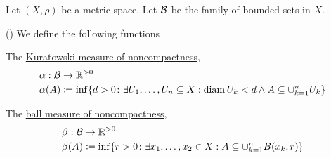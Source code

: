 Let $(X, \rho)$ be a metric space. Let $\mathcal{B}$ be the family of bounded sets in $X$.

\begin{definition}\label{def:noncompactness_measures}(\cite[definition 7.1]{Deimling1985})
  We define the following functions
  \begin{defenum}
    \item\label{def:noncompactness_measures/sets} The \uline{Kuratowski measure of noncompactness},
    \begin{align*}
      &\alpha: \mathcal{B} \to \mathbb{R}^{>0} \\
      &\alpha(A) \coloneqq \inf \{d > 0 \colon \exists U_1, \ldots, U_n \subseteq X: \operatorname{diam} {U_k} < d \land A \subseteq \cup_{k=1}^n U_k \}
    \end{align*}

    \item\label{def:noncompactness_measures/balls} The \uline{ball measure of noncompactness},
    \begin{align*}
      &\beta: \mathcal{B} \to \mathbb{R}^{>0} \\
      &\beta(A) \coloneqq \inf \{r > 0 \colon \exists x_1, \ldots, x_2 \in X: A \subseteq \cup_{k=1}^n B(x_k, r) \}
    \end{align*}
  \end{defenum}
\end{definition}

